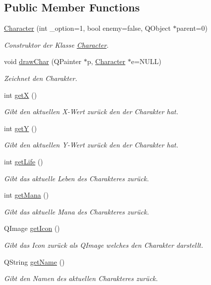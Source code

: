 \subsection*{Public Member Functions}
\begin{DoxyCompactItemize}
\item 
\hyperlink{class_character_aefeb2b4e6d072de60e7cacb4d2c81b7a}{Character} (int \+\_\+option=1, bool enemy=false, Q\+Object $\ast$parent=0)
\begin{DoxyCompactList}\small\item\em Construktor der Klasse \hyperlink{class_character}{Character}. \end{DoxyCompactList}\item 
void \hyperlink{class_character_a876cf4bd6f6241810cb3f6072e8205ed}{draw\+Char} (Q\+Painter $\ast$p, \hyperlink{class_character}{Character} $\ast$e=N\+U\+L\+L)
\begin{DoxyCompactList}\small\item\em Zeichnet den Charakter. \end{DoxyCompactList}\item 
int \hyperlink{class_character_a4b4280b04c7b8839ffb46bb3be4cb490}{get\+X} ()
\begin{DoxyCompactList}\small\item\em Gibt den aktuellen X-\/\+Wert zurück den der Charakter hat. \end{DoxyCompactList}\item 
int \hyperlink{class_character_a28c072ac846a33336cc7c5fb869c4cd8}{get\+Y} ()
\begin{DoxyCompactList}\small\item\em Gibt den aktuellen Y-\/\+Wert zurück den der Charakter hat. \end{DoxyCompactList}\item 
int \hyperlink{class_character_a1e00eede43aa9b436b0cbd2127ab251a}{get\+Life} ()
\begin{DoxyCompactList}\small\item\em Gibt das aktuelle Leben des Charakteres zurück. \end{DoxyCompactList}\item 
int \hyperlink{class_character_a047f58799c51258670497cda68ca4b8c}{get\+Mana} ()
\begin{DoxyCompactList}\small\item\em Gibt das aktuelle Mana des Charakteres zurück. \end{DoxyCompactList}\item 
Q\+Image \hyperlink{class_character_abd97793fd7945f52850018713e7726e3}{get\+Icon} ()
\begin{DoxyCompactList}\small\item\em Gibt das Icon zurück als Q\+Image welches den Charakter darstellt. \end{DoxyCompactList}\item 
Q\+String \hyperlink{class_character_a2c4dcc76fbba8481fba7e175378a4cd0}{get\+Name} ()
\begin{DoxyCompactList}\small\item\em Gibt den Namen des aktuellen Charakteres zurück. \end{DoxyCompactList}\end{DoxyCompactItemize}


